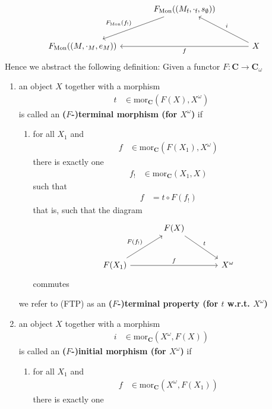 \[
\begin{tikzcd}[sep=large]
  &
  F_{\textrm{Mon}}((M_{\textrm{f}},\cdot_{\textrm{f}},s_{\emptyset}))
  \arrow[swap]{dl}{F_{\textrm{Mon}}(f_{!})}
  &
  \\
  F_{\textrm{Mon}}((M,\cdot_{M},e_{M}))
  &
  &
  X
  \arrow{ll}{f}
  \arrow[swap]{lu}{i}
\end{tikzcd}
\]
Hence we abstract the following definition: Given a functor $F \colon \mathbf{C} \rightarrow \mathbf{C}_{\omega}$
\begin{enumerate}
\item[(1)]
an object $X$ together with a morphism
\begin{align*}
  t
  &\in
  \mathrm{mor}_{\mathbf{C}}(F(X),X^{\omega})
\end{align*}
is called an \textbf{($F$-)terminal morphism (for $X^{\omega}$)} if
\begin{enumerate}
\item[(FTP)]
for all $X_{1}$ and
\begin{align*}
  f
  &\in
  \mathrm{mor}_{\mathbf{C}}(F(X_{1}),X^{\omega})
\end{align*}
there is exactly one
\begin{align*}
  f_{!}
  &\in
  \mathrm{mor}_{\mathbf{C}}(X_{1},X)
\end{align*}
such that
\begin{align*}
  f
  &=
  t
  \circ
  F(f_{!})
\end{align*}
that is, such that the diagram
\[
\begin{tikzcd}[sep=large]
  &
  F(X)
  \arrow{rd}{t}
  &
  \\
  F(X_{1})
  \arrow{ru}{F(f_{!})}
  \arrow{rr}{f}
  &
  &
  X^{\omega}
\end{tikzcd}
\]
commutes
\end{enumerate}
we refer to (FTP) as an \textbf{($F$-)terminal property (for $t$ w.r.t.
$X^{\omega}$)}
\item[(2)]
an object $X$ together with a morphism
\begin{align*}
  i
  &\in
  \mathrm{mor}_{\mathbf{C}}(X^{\omega},F(X))
\end{align*}
is called an \textbf{($F$-)initial morphism (for $X^{\omega}$)} if
\begin{enumerate}
\item[(FIP)]
for all $X_{1}$ and
\begin{align*}
  f
  &\in
  \mathrm{mor}_{\mathbf{C}}(X^{\omega},F(X_{1}))
\end{align*}
there is exactly one

\end{enumerate}
\end{enumerate}
